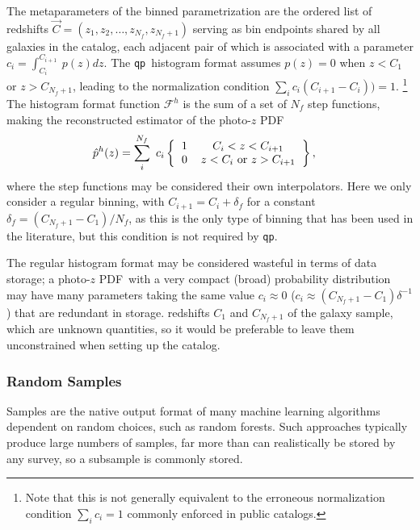 \documentclass[\docopts]{\docclass}
\newcommand{\qp}{\texttt{qp}\xspace}
\newcommand{\pz}{photo-$z$ PDF\xspace}
\begin{document}
The metaparameters of the binned parametrization are the ordered list of 
redshifts $\vec{C} = (z_{1}, z_{2}, \dots, z_{N_{f}}, z_{N_{f}+1})$ serving as 
bin endpoints shared by all galaxies in the catalog, each adjacent pair of 
which is associated with a parameter $c_{i}=\int_{C_{i}}^{C_{i+1}}\ p(z)dz$.
The \qp\ histogram format assumes $p(z)=0$ when $z<C_{1}$ or $z>C_{N_{f}+1}$, 
leading to the normalization condition $\sum_{i} c_{i}(C_{i+1}-C_{i})) = 1$.
\footnote{Note that this is not generally equivalent to the erroneous 
normalization condition $\sum_{i} c_{i} = 1$ commonly enforced in public 
catalogs.}
The histogram format function $\mathcal{F}^{h}$ is the sum of a set of $N_{f}$ 
step functions, making the reconstructed estimator of the \pz
\begin{align}
  \label{eq:binned}
  \hat{p}^{h}(z) &= \sum_{i}^{N_{f}}\ c_{i} 
\left\{\begin{tabular}{cc}$1$&$C_{i}<z<C_{i+1}$\\
0&$z < C_{i}$\ or\ $z > C_{i+1}$\end{tabular}\right\},
\end{align}
where the step functions may be considered their own interpolators.
Here we only consider a regular binning, with $C_{i+1}=C_{i}+\delta_{f}$ for a 
constant $\delta_{f}=(C_{N_{f}+1}-C_{1})/N_{f}$, as this is the only type of 
binning that has been used in the literature, but this condition is not 
required by \qp.

The regular histogram format may be considered wasteful in terms of data 
storage; a \pz\ with a very compact (broad) probability distribution may have 
many parameters taking the same value $c_{i}\approx0$ 
($c_{i}\approx(C_{N_{f}+1}-C_{1})\delta^{-1}$) that are redundant in storage.  
redshifts $C_{1}$ and $C_{N_{f}+1}$ of the galaxy sample, which are unknown 
quantities, so it would be preferable to leave them unconstrained when setting 
up the catalog.

\subsubsection{Random Samples}
\label{sec:samples}

Samples are the native output format of many machine learning algorithms 
dependent on random choices, such as random forests.
Such approaches typically produce large numbers of samples, far more than can 
realistically be stored by any survey, so a subsample is commonly stored.
\end{document}
